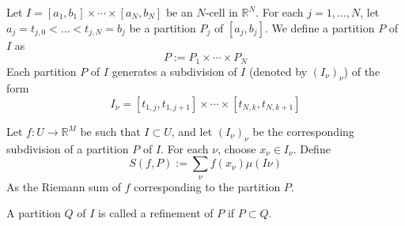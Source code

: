 \documentclass[12pt]{article}
\newcommand{\R}{\mathbb{R}}
\begin{document}
Let $I = [a_1, b_1] \times \cdots \times [a_N, b_N]$ be an $N$-cell in $\R^N$. For each $j = 1, \ldots, N$, let $a_j = t_{j,0} < \ldots < t_{j,N} = b_j$ be a partition $P_j$ of $[a_j, b_j]$. We define a partition $P$ of $I$ as
\[
P := P_1 \times \cdots \times P_N
\]
Each partition $P$ of $I$ generates a subdivision of $I$ (denoted by $(I_\nu)_\nu$) of the form
\[
I_\nu = [t_{1,j},t_{1,j+1}]\times \cdots \times [t_{N,k},t_{N,k+1}]
\]

Let $f : U \to \R^M$ be such that $I \subset U$, and let $(I_\nu)_\nu$ be the corresponding subdivision of a partition $P$ of $I$. For each $\nu$, choose $x_\nu \in I_\nu$. Define
\[
S(f,P) := \sum_\nu f(x_\nu)\mu(I\nu)
\]
As the Riemann sum of $f$ corresponding to the partition $P$.

A partition $Q$ of $I$ is called a refinement of $P$ if $P \subset Q$.
\end{document}
